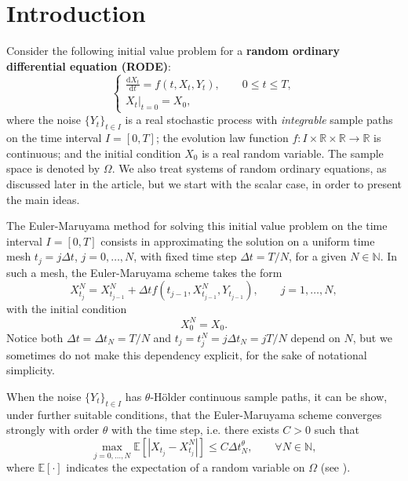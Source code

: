 \documentclass[reqno,12pt]{amsart}
\theoremstyle{plain}%
\theoremstyle{definition}
\begin{document}
\maketitle

\section{Introduction}

Consider the following initial value problem for a \textbf{random ordinary differential equation (RODE)}:
\begin{equation}
  \label{rodeeq}
  \begin{cases}
    \displaystyle \frac{\mathrm{d}X_t}{\mathrm{d} t} = f(t, X_t, Y_t), \qquad 0 \leq t \leq T, \\
    \left. X_t \right|_{t = 0} = X_0,
  \end{cases}
\end{equation}
where the noise $\{Y_t\}_{t\in I}$ is a real stochastic process with \emph{integrable} sample paths on the time interval $I=[0, T]$; the evolution law function $f:I \times \mathbb{R} \times\mathbb{R} \rightarrow \mathbb{R}$ is continuous; and the initial condition $X_0$ is a real random variable. The sample space is denoted by $\Omega$. We also treat systems of random ordinary equations, as discussed later in the article, but we start with the scalar case, in order to present the main ideas.

The Euler-Maruyama method for solving this initial value problem on the time interval $I = [0, T]$ consists in approximating the solution on a uniform time mesh $t_j = j\Delta t$, $j = 0, \ldots, N$, with fixed time step $\Delta t = T/N$, for a given $N\in \mathbb{N}$. In such a mesh, the Euler-Maruyama scheme takes the form
\begin{equation}
  \label{emscheme}
  X_{t_j}^N = X_{t_{j-1}}^N + \Delta t f(t_{j-1}, X_{t_{j-1}}^N, Y_{t_{j-1}}), \qquad j = 1, \ldots, N,
\end{equation}
with the initial condition
\begin{equation}
  \label{iccondition}
  X_0^N = X_0.
\end{equation}
Notice both $\Delta t = \Delta t_N = T/N$ and $t_j = t_j^N = j\Delta t_N = jT/N$ depend on $N$, but we sometimes do not make this dependency explicit, for the sake of notational simplicity.

When the noise $\{Y_t\}_{t\in I}$ has $\theta$-H\"older continuous sample paths, it can be show, under further suitable conditions, that the Euler-Maruyama scheme converges strongly with order $\theta$ with the time step, i.e. there exists $C > 0$ such that
\begin{equation}
    \max_{j=0, \ldots, N}\mathbb{E}\left[ \left| X_{t_j} - X_{t_j}^N \right| \right] \leq C \Delta t_N^\theta, \qquad \forall N \in \mathbb{N},
\end{equation}
where $\mathbb{E}[\cdot]$ indicates the expectation of a random variable on $\Omega$ (see \cite{}).
\end{document}
